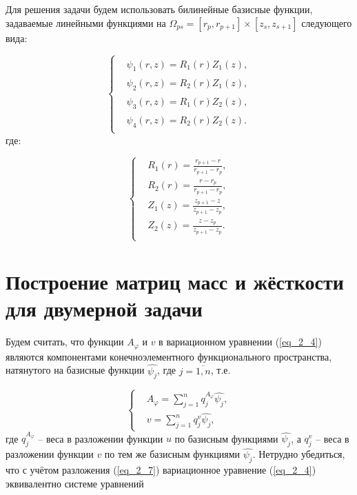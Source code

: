 Для решения задачи будем использовать билинейные базисные функции, задаваемые линейными функциями на $\Omega_{ps} = [r_p, r_{p + 1}] \times [z_s, z_{s + 1}]$ следующего вида: 


\begin{equation} \label{eq_2_5}
	\begin{cases}
		& \hat{\psi_1}(r,z) = R_1(r)Z_1(z), \\
		& \hat{\psi_2}(r,z) = R_2(r)Z_1(z), \\
		& \hat{\psi_3}(r,z) = R_1(r)Z_2(z), \\
		& \hat{\psi_4}(r,z) = R_2(r)Z_2(z). \\
	\end{cases}
\end{equation}
где:

\begin{equation} \label{eq_2_6}
	\begin{cases}
		& R_1(r) = \frac{r_{p + 1} - r}{r_{p + 1} - r_p}, \\
		& R_2(r) = \frac{r - r_p}{r_{p + 1} - r_p}, \\
		& Z_1(z) = \frac{z_{p + 1} - z}{z_{p + 1} - z_p}, \\
		& Z_2(z) = \frac{z - z_p}{z_{p + 1} - z_p}. \\
	\end{cases}
\end{equation}


\section{Построение матриц масс и жёсткости для двумерной задачи}

Будем считать, что функции $A_{\varphi}$ и $v$ в вариационном уравнении (\ref{eq_2_4}) являются компонентами конечноэлементного функционального пространства, натянутого на базисные функции $\hat{\psi_j}$, где $j = \overline{1, n}$, т.е.

\begin{equation} \label{eq_2_7}
	\begin{cases}
		& A_{\varphi} = \displaystyle\sum_{j=1}^{n} q_j^{A_{\varphi}} \hat{\psi_j}, \\
		& v = \displaystyle\sum_{j=1}^{n} q_j^v \hat{\psi_j},
	\end{cases}
\end{equation}
где $q_j^{A_{\varphi}}$ -- веса в разложении функции $u$ по базисным функциями $\hat{\psi_j}$, а $q_j^v$ -- веса в разложении функции $v$ по тем же базисным функциями $\hat{\psi_j}$. Нетрудно убедиться, что с учётом разложения (\ref{eq_2_7}) вариационное уравнение (\ref{eq_2_4}) эквивалентно системе уравнений

